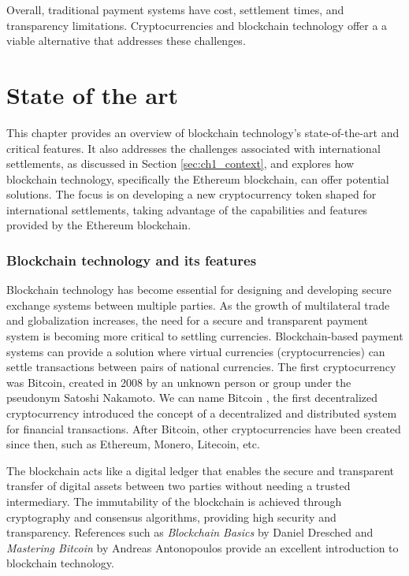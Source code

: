Overall, traditional payment systems have cost, settlement times, and transparency limitations. Cryptocurrencies and blockchain technology offer a
a viable alternative that addresses these challenges.


\section{State of the art}
\label{sec:state_of_the_art}


This chapter provides an overview of blockchain technology's state-of-the-art and critical features. It also addresses the challenges 
associated with international settlements, as discussed in Section \ref{sec:ch1_context}, and explores how blockchain technology, specifically 
the Ethereum blockchain, can offer potential solutions. The focus is on developing a new cryptocurrency token shaped for international settlements, 
taking advantage of the capabilities and features provided by the Ethereum blockchain. 

\subsubsection{Blockchain technology and its features}

Blockchain technology has become essential for designing and developing secure exchange systems between multiple parties. 
As the growth of multilateral trade and globalization increases, the need for a secure and transparent payment 
system is becoming more critical to settling currencies. Blockchain-based payment systems can provide a solution where virtual currencies 
(cryptocurrencies) can settle transactions between pairs of national currencies. The first cryptocurrency was Bitcoin, created in 
2008 \cite{online_satoshinakamoto} by an unknown person or group under the pseudonym Satoshi Nakamoto. We can name Bitcoin
, the first decentralized cryptocurrency introduced the concept of a decentralized and distributed system for 
financial transactions. After Bitcoin, other cryptocurrencies have been created since then, such as Ethereum, Monero, Litecoin, etc.

The blockchain acts like a digital ledger that enables the secure and transparent transfer of digital assets
between two parties without needing a trusted intermediary. The immutability of the blockchain is achieved through
cryptography and consensus algorithms, providing high security and transparency. References such as \textit{Blockchain Basics} by
Daniel Dresched \cite{Drescher2017-hj} and \textit{Mastering Bitcoin} by Andreas Antonopoulos \cite{Antonopoulos2017-et} provide an excellent introduction
to blockchain technology.

